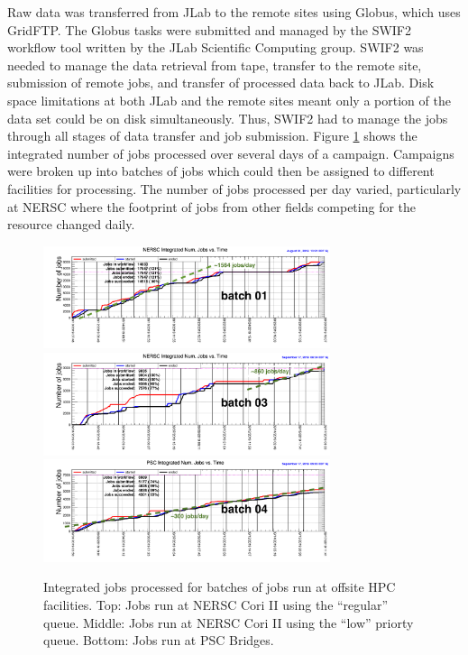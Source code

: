 Raw data was transferred from JLab to the remote sites using Globus,  which uses GridFTP. The Globus tasks were submitted and managed by the SWIF2 workflow tool written by the JLab Scientific Computing group. SWIF2 was needed to manage the data retrieval from tape, transfer to the remote site, submission of remote jobs, and transfer of processed data back to JLab. Disk space limitations at both JLab and the remote sites meant only a portion of the data set could be on disk simultaneously. Thus, SWIF2 had to manage the jobs through all stages of data transfer and job submission. Figure \ref{fig:production_offsite_RunPeriod2018-08_batch01_iNjobs_vs_time} shows the integrated number of jobs processed over several days of a campaign. Campaigns were broken up into batches of jobs which could then be assigned to different facilities for processing. The number of jobs processed per day varied, particularly at NERSC where the footprint of jobs from other fields competing for the resource changed daily.

\begin{figure}[h!]\centering
\includegraphics[width=0.75\textwidth]{figures/production_offsite_RunPeriod2018-08_batch01_iNjobs_vs_time.png}
\includegraphics[width=0.75\textwidth]{figures/production_offsite_RunPeriod2018-08_batch03_iNjobs_vs_time.png}
\includegraphics[width=0.75\textwidth]{figures/production_offsite_RunPeriod2018-08_batch04_iNjobs_vs_time.png}
\caption[]{\label{fig:production_offsite_RunPeriod2018-08_batch01_iNjobs_vs_time}Integrated jobs processed for batches of jobs run at offsite HPC facilities. Top: Jobs run at NERSC Cori II using the ``regular'' queue. Middle: Jobs run at NERSC Cori II using the ``low'' priorty queue. Bottom: Jobs run at PSC Bridges.} 
\end{figure}



